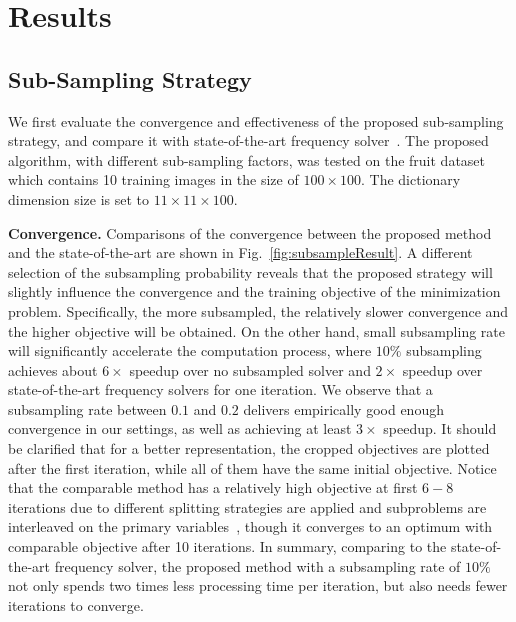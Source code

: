 \section{Results} \label{sec:result}
\subsection{Sub-Sampling Strategy}
We first evaluate the convergence and effectiveness of the proposed sub-sampling strategy, and compare it with state-of-the-art frequency solver~\cite{heide2015fast}. The proposed algorithm, with different sub-sampling factors, was tested on the fruit dataset~\cite{zeiler2010deconvolutional} which contains 10 training images in the size of $100 \times 100$. The dictionary dimension size is set to $11 \times 11 \times 100$.

{\bfseries Convergence.} Comparisons of the convergence between the proposed method and the state-of-the-art are shown in Fig.~\ref{fig:subsampleResult}. A different selection of the subsampling probability reveals that the proposed strategy will slightly influence the convergence and the training objective of the minimization problem. Specifically, the more subsampled, the relatively slower convergence and the higher objective will be obtained. On the other hand, small subsampling rate will significantly accelerate the computation process, where $10\%$ subsampling achieves about $6 \times$ speedup over no subsampled solver and $2 \times$ speedup over state-of-the-art frequency solvers for one iteration. We observe that a subsampling rate between $0.1$ and $0.2$ delivers empirically good enough convergence in our settings, as well as achieving at least $3 \times$ speedup. It should be clarified that for a better representation, the cropped objectives are plotted after the first iteration, while all of them have the same initial objective. Notice that the comparable method has a relatively high objective at first $6-8$ iterations due to different splitting strategies are applied and subproblems are interleaved on the primary variables~\cite{wohlberg2016efficient}, though it converges to an optimum with comparable objective after 10 iterations. In summary, comparing to the state-of-the-art frequency solver, the proposed method with a subsampling rate of $10\%$ not only spends two times less processing time per iteration, but also needs fewer iterations to converge.

